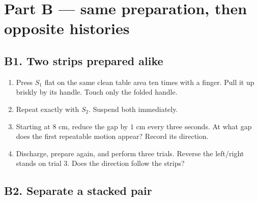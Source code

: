 \newpage
\normalsize
{}
\section{Part B --- same preparation, then opposite histories}

\subsection{B1. Two strips prepared alike}

\begin{enumerate}
  \item Press \(S_1\) flat on the same clean table area ten times with a finger.
    Pull it up briskly by its handle. Touch only the folded handle.
  \item Repeat exactly with \(S_2\). Suspend both immediately.
  \item Starting at \(8\) cm, reduce the gap by \(1\) cm every three seconds.
    At what gap does the first repeatable motion appear? Record its direction.
  \item Discharge, prepare again, and perform three trials. Reverse the
    left/right stands on trial 3. Does the direction follow the strips?
\end{enumerate}

\begin{center}
\end{center}

\subsection{B2. Separate a stacked pair}

